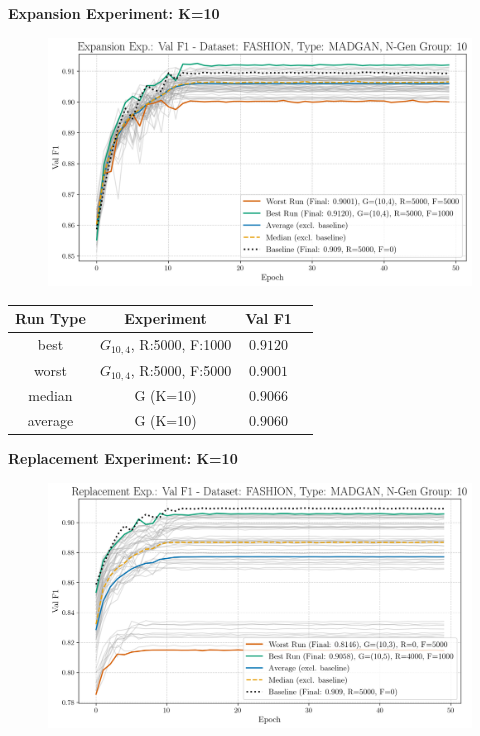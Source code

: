 \newpage
\noindent\textbf{Expansion Experiment: K=10}
\begin{figure}[htbp]
	\centering
	\includegraphics[width=.85\textwidth]{abb/strat_classifier_performance/FASHION_STRATIFIED_CLASSIFIERS_MADGAN_NEW/expansion_experiments/val_f1_score_MADGAN_FASHION_n_gen_10_all.png}
	\label{fig:app_strat_class_performance_expansion_exp._val_f1_score_10}
\end{figure}
\begin{table}[H]
	\vspace{-1em}
	\centering
	\begin{tabular}{|c|c|c|c|}
		\hline
		Run Type & Experiment & Val F1 \\ \hline
		best & \(G_{10, 4}\), R:5000, F:1000 & $0.9120$\\ \hline
		worst & \(G_{10, 4}\), R:5000, F:5000 & $0.9001$\\ \hline
		median & G (K=10) & $0.9066$\\ \hline
		average & G (K=10) & $0.9060$
		\\ \hline
	\end{tabular}
\end{table}
\noindent\textbf{Replacement Experiment: K=10}
\begin{figure}[htbp]
	\centering
	\includegraphics[width=.85\textwidth]{abb/strat_classifier_performance/FASHION_STRATIFIED_CLASSIFIERS_MADGAN_NEW/replacement_experiments/val_f1_score_MADGAN_FASHION_n_gen_10_all.png}
	\label{fig:app_strat_class_performance_replacement_exp._val_f1_score_10}
\end{figure}
